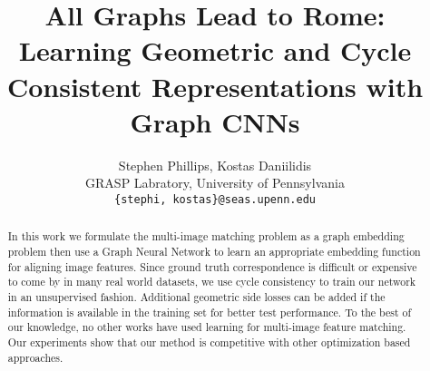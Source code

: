 \documentclass[10pt,twocolumn,letterpaper]{article}
\begin{document}
\title{All Graphs Lead to Rome: Learning Geometric and Cycle Consistent Representations with Graph CNNs}

\author{Stephen Phillips, Kostas Daniilidis \\
GRASP Labratory, University of Pennsylvania\\
{\tt\small \{stephi, kostas\}@seas.upenn.edu}
}



\maketitle


\begin{abstract}
   In this work we formulate the multi-image matching problem as a graph embedding problem then use a Graph Neural Network to learn an appropriate embedding function for aligning image features.
   Since ground truth correspondence is difficult or expensive to come by in many real world datasets, we use cycle consistency to train our network in an unsupervised fashion.
   Additional geometric side losses can be added if the information is available in the training set for better test performance.
   To the best of our knowledge, no other works have used learning for multi-image feature matching.
   Our experiments show that our method is competitive with other optimization based approaches.
\end{abstract}
\end{document}
